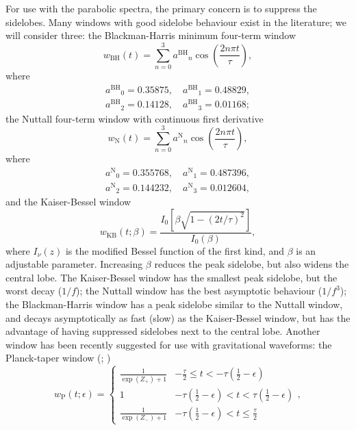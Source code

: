 \documentclass[useAMS,usedcolumn,usegraphicx,usenatbib]{mn2e}
\newcommand{\sub}[1]{\ensuremath{_\mathrm{#1}}}
\newcommand{\super}[1]{\ensuremath{^\mathrm{#1}}}
\newcommand{\recip}[1]{\ensuremath{\frac{1}{#1}}}
\begin{document}
For use with the parabolic spectra, the primary concern is to suppress the sidelobes. Many windows with good sidelobe behaviour exist in the literature; we will consider three: the Blackman-Harris minimum four-term window \citep{Harris1978, Nuttall1981}
\begin{equation}
w\sub{BH}(t) = \sum_{n=0}^{3} a\super{BH}_n\cos\left(\frac{2n\pi t}{\tau}\right),
\end{equation}
where
\begin{equation}
\begin{split}
a\super{BH}_0 = 0.35875, \quad a\super{BH}_1 = 0.48829,\\
a\super{BH}_2 = 0.14128, \quad a\super{BH}_3 = 0.01168;
\end{split}
\end{equation}
the Nuttall four-term window with continuous first derivative \citep{Nuttall1981}
\begin{equation}
w\sub{N}(t) = \sum_{n=0}^{3} a\super{N}_n\cos\left(\frac{2n\pi t}{\tau}\right),
\end{equation}
where
\begin{equation}
\begin{split}
a\super{N}_0 = 0.355768, \quad a\super{N}_1 = 0.487396,\\
a\super{N}_2 = 0.144232, \quad a\super{N}_3 = 0.012604,
\end{split}
\end{equation}
and the Kaiser-Bessel window \citep{Harris1978, Kaiser1980}
\begin{equation}
w\sub{KB}(t;\beta) = \frac{I_0\left[\beta\sqrt{1 - (2 t/\tau)^2}\right]}{I_0(\beta)},
\end{equation}
where $I_\nu(z)$ is the modified Bessel function of the first kind, and $\beta$ is an adjustable parameter. Increasing $\beta$ reduces the peak sidelobe, but also widens the central lobe. The Kaiser-Bessel window has the smallest peak sidelobe, but the worst decay ($1/f$); the Nuttall window has the best asymptotic behaviour ($1/f^3$); the Blackman-Harris window has a peak sidelobe similar to the Nuttall window, and decays asymptotically as fast (slow) as the Kaiser-Bessel window, but has the advantage of having suppressed sidelobes next to the central lobe. Another window has been recently suggested for use with gravitational waveforms: the Planck-taper window (\citealt*{Damour2000}; \citealt{McKechan2010})
\begin{equation}
w\sub{P}(t; \epsilon) = \begin{cases}
 {\displaystyle \recip{\exp(Z_+)+1}} & {\displaystyle -\frac{\tau}{2} \leq t < -\tau\left(\recip{2} - \epsilon\right)} \\
 1 & {\displaystyle -\tau\left(\recip{2} - \epsilon\right) < t < \tau\left(\recip{2} - \epsilon\right)} \\
 {\displaystyle \recip{\exp(Z_-)+1}} & {\displaystyle -\tau\left(\recip{2} - \epsilon\right) < t \leq \frac{\tau}{2}}
\end{cases},
\end{equation}
\end{document}

